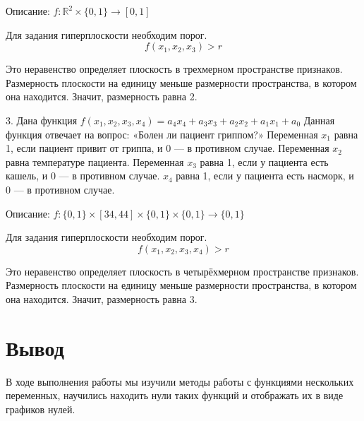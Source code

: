 \documentclass[14pt,a4paper]{extarticle}
\begin{document}
Описание: $f: \mathbb{R}^2 \times \{0, 1\} \rightarrow [0, 1] $

Для задания гиперплоскости необходим порог.
\begin{equation*}
    f(x_1, x_2, x_3) > r
\end{equation*}

Это неравенство определяет плоскость в трехмерном пространстве
признаков. Размерность плоскости на единицу меньше размерности
пространства, в котором она находится. Значит, размерность равна 2.

3. Дана функция \(f(x_1, x_2, x_3, x_4) = a_4 x_4 + a_3 x_3 + a_2 x_2 + a_1 x_1 + a_0\)
Данная функция отвечает на вопрос: «Болен ли пациент гриппом?»
Переменная $x_1$ равна 1, если пациент привит от гриппа, и 0 — в
противном случае. Переменная $x_2$ равна температуре пациента.
Переменная $x_3$ равна 1, если у пациента есть кашель, и 0 — в
противном случае. $x_4$ равна 1, если у пациента есть насморк,
и 0 — в противном случае.

Описание: $f: \{0, 1\}\times [34, 44]\times\{0, 1\}\times\{0, 1\} \rightarrow \{0, 1\} $

Для задания гиперплоскости необходим порог.
\begin{equation*}
    f(x_1, x_2, x_3, x_4) > r
\end{equation*}

Это неравенство определяет плоскость в четырёхмерном пространстве
признаков. Размерность плоскости на единицу меньше размерности
пространства, в котором она находится. Значит, размерность равна 3.

\section*{Вывод}
В ходе выполнения работы мы изучили методы работы с функциями нескольких
переменных, научились находить нули таких функций и отображать их в виде
графиков нулей.
\end{document}
